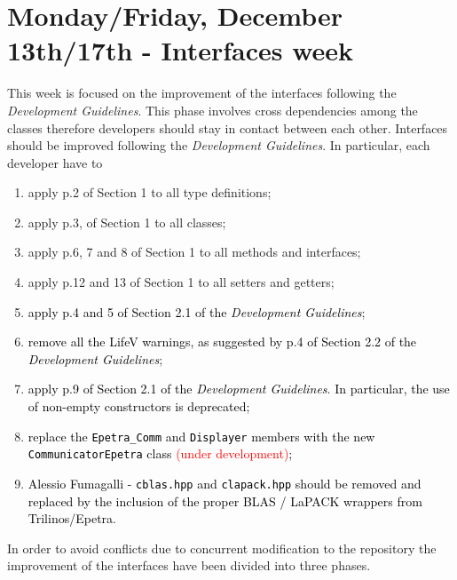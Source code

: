 \documentclass[10p]{article}
\newcommand{\todo}[1]{\textcolor{red}{#1}}
\newcommand{\newparts}[1]{\textcolor{black}{#1}}
\newcommand{\newpartsVC}[1]{\textcolor{black}{#1}}
\theoremstyle{definition}
\begin{document}
\section*{Monday/Friday, December 13th/17th - Interfaces week}
This week is focused on the improvement of the interfaces following the \emph{Development Guidelines}. This phase involves cross dependencies among the classes therefore developers should stay in contact between each other. Interfaces should be improved following the \emph{Development Guidelines}. In particular, each developer have to
\begin{enumerate}
  \item apply p.2 of Section 1 to all type definitions;
  \item apply p.3, of Section 1 to all classes;
  \item apply p.6, 7 and 8 of Section 1 to all methods and interfaces;
  \item apply p.12 and 13 of Section 1 to all setters and getters;
  \item \newparts{apply p.4 and 5 of Section 2.1 of the \emph{Development Guidelines}};
  \item \newpartsVC{remove all the LifeV warnings, as suggested by p.4 of Section 2.2 of the \emph{Development Guidelines}};
  \item \newpartsVC{apply p.9 of Section 2.1 of the \emph{Development Guidelines}}. \newparts{In particular, the use of non-empty constructors is deprecated;}
  \item \newpartsVC{replace the \texttt{Epetra\_Comm} and \texttt{Displayer} members with the new \texttt{CommunicatorEpetra} class \todo{(under development)};}
  \item \newpartsVC{Alessio Fumagalli - \texttt{cblas.hpp} and \texttt{clapack.hpp} should be removed and replaced
  by the inclusion of the proper BLAS / LaPACK wrappers from Trilinos/Epetra}.
\end{enumerate}

In order to avoid conflicts due to concurrent modification to the repository the improvement of the interfaces have been divided into three phases.
\end{document}
